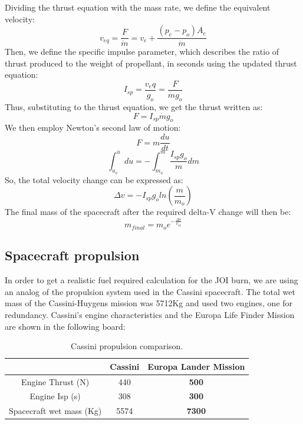 Dividing the thrust equation with the mass rate, we define the equivalent velocity:
\begin{equation}
v_{eq}=\frac{F}{\dot{m}}=v_e+\frac{(p_e-p_o) A_e}{\dot{m}}
\end{equation}
Then, we define the specific impulse parameter, which describes the ratio of thrust produced to the weight of propellant, in seconds using the updated thrust equation:
\begin{equation}
I_{sp}=\frac{v_eq}{g_o} =\frac{F}{\dot{m}g_o}
\end{equation}
Thus, substituting to the thrust equation, we get the thrust written as:
\begin{equation}
F=I_{sp}\dot{m}g_o
\end{equation}
We then employ Newton’s second law of motion:
\begin{equation}
F=m\frac{du}{dt}
\end{equation}
\begin{equation}
\int_{u_o}^{u}du=-\int_{m_o}^{m}\frac{I_{sp}g_o}{m}dm
\end{equation}
So, the total velocity change can be expressed as:
\begin{equation}
\Delta v=-I_{sp}g_o ln(\frac{m}{m_o})
\end{equation}
The final mass of the spacecraft after the required delta-V change will then be:
\begin{equation}
m_{final}=m_{o}e^{-\frac{\Delta v}{v_{eq}}}
\end{equation}
\subsection{Spacecraft propulsion}
In order to get a realistic fuel required calculation for the JOI burn, we are using an analog of the propulsion system used in the Cassini spacecraft. The total wet mass of the Cassini-Huygens mission was 5712Kg \cite{cassini} and used two engines, one for redundancy.
Cassini's engine characteristics and the Europa Life Finder Mission are shown in the following board:

\begin{table}[htb!]
  \centering
    \begin{tabular}{|c|c|c|}
    \hline
          & \textbf{Cassini} & \textbf{Europa Lander Mission} \bigstrut\\
    \hline
    Engine Thrust (N) & 440   & \textbf{500} \bigstrut\\
    \hline
    Engine Isp (s) & 308   & \textbf{300} \bigstrut\\
    \hline
    Spacecraft wet mass (Kg) & 5574  & \textbf{7300} \bigstrut\\
    \hline
    \end{tabular}%
    \caption{Cassini propulsion comparison.\cite{cassini}}
  \label{tab:propulsion}%
\end{table}%

